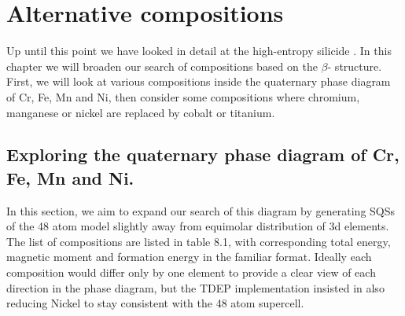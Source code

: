\chapter{Alternative compositions}
\label{sec:comps}

Up until this point we have looked in detail at the high-entropy silicide . In this chapter we will broaden our search of compositions based on the $\beta$- structure. First, we will look at various compositions inside the quaternary phase diagram of Cr, Fe, Mn and Ni, then consider some compositions where chromium, manganese or nickel are replaced by cobalt or titanium. 

\section{Exploring the quaternary phase diagram of Cr, Fe, Mn and Ni.}
In this section, we aim to expand our search of this diagram by generating SQSs of the 48 atom model slightly away from equimolar distribution of 3d elements. The list of compositions are listed in table 8.1, with corresponding total energy, magnetic moment and formation energy in the familiar format. Ideally each composition would differ only by one element to provide a clear view of each direction in the phase diagram, but the TDEP implementation insisted in also reducing Nickel to stay consistent with the 48 atom supercell. 

